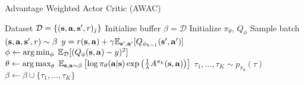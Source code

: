 \begin{algorithm}[H]
  	\caption{Advantage Weighted Actor Critic (AWAC)}
  	\label{alg:method}
  	\begin{algorithmic}[1]
  	\STATE Dataset $\mathcal{D} = \{(\mathbf{s}, \mathbf{a}, \mathbf{s}', r)_j\}$
  	\STATE Initialize buffer $\beta=\mathcal{D}$
  	\STATE Initialize $\pi_\theta$, $Q_\phi$
  	    \STATE Sample batch $(\mathbf{s}, \mathbf{a}, \mathbf{s}', r) \sim \beta$
        \STATE $y = r(\mathbf{s}, \mathbf{a}) + \gamma \mathbb{E}_{\mathbf{s}',\mathbf{a}'}[Q_{\phi_{k-1}}(\mathbf{s}', \mathbf{a}')]$
        \STATE $\phi \gets \arg\min_\phi \; \mathbb{E}_\mathcal{D}[(Q_\phi(\mathbf{s}, \mathbf{a}) - y)^2]$
        \STATE $\theta \gets \operatorname*{arg\,max}_\theta \; \operatorname*{\mathbb{E}}_{\mathbf{s}, \mathbf{a} \sim \beta}
    \left[\log \pi_\theta(\mathbf{a}|\mathbf{s}) \exp \left(\frac{1}{\lambda}A^{\pi_k}(\mathbf{s}, \mathbf{a}) \right)\right]$
            \STATE $\tau_1, \dots, \tau_K \sim p_{\pi_\theta}(\tau)$
            \STATE $\beta \gets \beta \cup \{\tau_1, \dots, \tau_K\}$
        \ENDIF
  	\ENDFOR
  	\end{algorithmic}
\end{algorithm}

